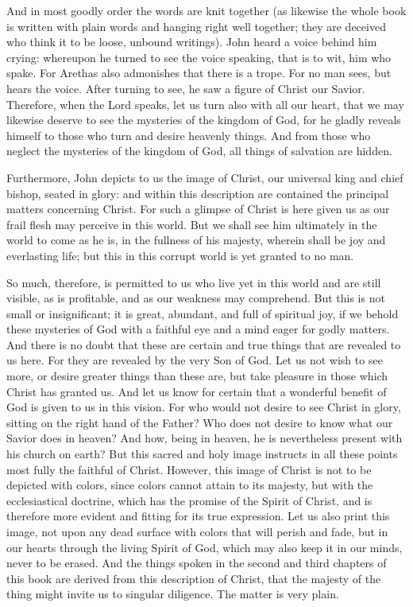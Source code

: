 And in most goodly order the words are knit together (as likewise the whole book is written with plain words and hanging right well together; they are deceived who think it to be loose, unbound writings). John heard a voice behind him crying: whereupon he turned to see the voice speaking, that is to wit, him who spake. For Arethas also admonishes that there is a trope. For no man sees, but hears the voice. After turning to see, he saw a figure of Christ our Savior. Therefore, when the Lord speaks, let us turn also with all our heart, that we may likewise deserve to see the mysteries of the kingdom of God, for he gladly reveals himself to those who turn and desire heavenly things. And from those who neglect the mysteries of the kingdom of God, all things of salvation are hidden.

Furthermore, John depicts to us the image of Christ, our universal king and chief bishop, seated in glory: and within this description are contained the principal matters concerning Christ. For such a glimpse of Christ is here given us as our frail flesh may perceive in this world. But we shall see him ultimately in the world to come as he is, in the fullness of his majesty, wherein shall be joy and everlasting life; but this in this corrupt world is yet granted to no man.

So much, therefore, is permitted to us who live yet in this world and are still visible, as is profitable, and as our weakness may comprehend. But this is not small or insignificant; it is great, abundant, and full of spiritual joy, if we behold these mysteries of God with a faithful eye and a mind eager for godly matters. And there is no doubt that these are certain and true things that are revealed to us here. For they are revealed by the very Son of God. Let us not wish to see more, or desire greater things than these are, but take pleasure in those which Christ has granted us. And let us know for certain that a wonderful benefit of God is given to us in this vision. For who would not desire to see Christ in glory, sitting on the right hand of the Father? Who does not desire to know what our Savior does in heaven? And how, being in heaven, he is nevertheless present with his church on earth? But this sacred and holy image instructs in all these points most fully the faithful of Christ. However, this image of Christ is not to be depicted with colors, since colors cannot attain to its majesty, but with the ecclesiastical doctrine, which has the promise of the Spirit of Christ, and is therefore more evident and fitting for its true expression. Let us also print this image, not upon any dead surface with colors that will perish and fade, but in our hearts through the living Spirit of God, which may also keep it in our minds, never to be erased. And the things spoken in the second and third chapters of this book are derived from this description of Christ, that the majesty of the thing might invite us to singular diligence. The matter is very plain.

